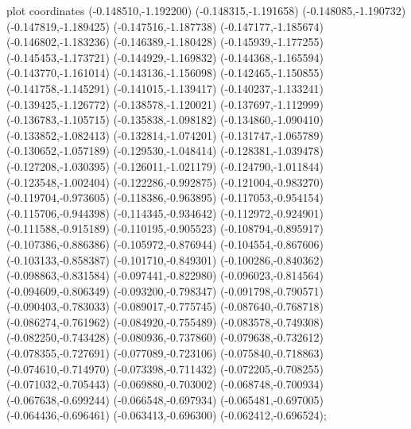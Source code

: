 { plot coordinates {(-0.148510,-1.192200) (-0.148315,-1.191658) (-0.148085,-1.190732) (-0.147819,-1.189425) (-0.147516,-1.187738) (-0.147177,-1.185674) (-0.146802,-1.183236) (-0.146389,-1.180428) (-0.145939,-1.177255) (-0.145453,-1.173721) (-0.144929,-1.169832) (-0.144368,-1.165594) (-0.143770,-1.161014) (-0.143136,-1.156098) (-0.142465,-1.150855) (-0.141758,-1.145291) (-0.141015,-1.139417) (-0.140237,-1.133241) (-0.139425,-1.126772) (-0.138578,-1.120021) (-0.137697,-1.112999) (-0.136783,-1.105715) (-0.135838,-1.098182) (-0.134860,-1.090410) (-0.133852,-1.082413) (-0.132814,-1.074201) (-0.131747,-1.065789) (-0.130652,-1.057189) (-0.129530,-1.048414) (-0.128381,-1.039478) (-0.127208,-1.030395) (-0.126011,-1.021179) (-0.124790,-1.011844) (-0.123548,-1.002404) (-0.122286,-0.992875) (-0.121004,-0.983270) (-0.119704,-0.973605) (-0.118386,-0.963895) (-0.117053,-0.954154) (-0.115706,-0.944398) (-0.114345,-0.934642) (-0.112972,-0.924901) (-0.111588,-0.915189) (-0.110195,-0.905523) (-0.108794,-0.895917) (-0.107386,-0.886386) (-0.105972,-0.876944) (-0.104554,-0.867606) (-0.103133,-0.858387) (-0.101710,-0.849301) (-0.100286,-0.840362) (-0.098863,-0.831584) (-0.097441,-0.822980) (-0.096023,-0.814564) (-0.094609,-0.806349) (-0.093200,-0.798347) (-0.091798,-0.790571) (-0.090403,-0.783033) (-0.089017,-0.775745) (-0.087640,-0.768718) (-0.086274,-0.761962) (-0.084920,-0.755489) (-0.083578,-0.749308) (-0.082250,-0.743428) (-0.080936,-0.737860) (-0.079638,-0.732612) (-0.078355,-0.727691) (-0.077089,-0.723106) (-0.075840,-0.718863) (-0.074610,-0.714970) (-0.073398,-0.711432) (-0.072205,-0.708255) (-0.071032,-0.705443) (-0.069880,-0.703002) (-0.068748,-0.700934) (-0.067638,-0.699244) (-0.066548,-0.697934) (-0.065481,-0.697005) (-0.064436,-0.696461) (-0.063413,-0.696300) (-0.062412,-0.696524)};
}
